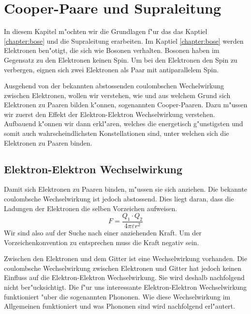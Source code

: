 \chapter{Cooper-Paare und Supraleitung\label{chapter:supraleitung}}
\begin{refsection}


In diesem Kapitel m"ochten wir die Grundlagen f"ur das das Kaptiel \ref{chapter:bose} und
die Supraleitung erarbeiten. Im Kaptiel \ref{chapter:bose} werden Elektronen ben"otigt,
die sich wie Bosonen verhalten. Bosonen haben im Gegensatz zu den Elektronen
keinen Spin. Um bei den Elektronen den Spin zu verbergen, eignen sich zwei Elektronen als Paar mit
antiparallelem Spin.

Ausgehend von der bekannten abstossenden coulombschen Wechelwirkung zwischen Elektronen,
wollen wir verstehen, wie und aus welchem Grund sich Elektronen zu Paaren bilden k"onnen,
sogenannten Cooper-Paaren.
Dazu m"ussen wir zuerst den Effekt der Elektron-Elektron Wechselwirkung verstehen.
Aufbauend k"onnen wir dann erkl"aren, welches die energetisch g"unstigsten und somit auch
wahrscheindlichsten Konstellationen sind, unter welchen sich die Elektronen zu Paaren binden.

\section{Elektron-Elektron Wechselwirkung\label{supraleitung:elektronelektronwecheslwirkung}}
Damit sich Elektronen zu Paaren binden, m"ussen sie sich anziehen.
Die bekannte coulombsche Wechselwirkung ist jedoch abstossend.
Dies liegt daran, dass die Ladungen der Elektronen die selben Vorzeichen aufweisen.
\begin{equation}
F = \frac{Q_1\cdot Q_2}{4\pi \varepsilon r^2}
\label{supraleitung:Coulomb}
\end{equation}
Wir sind also auf der Suche nach einer anziehenden Kraft.
Um der Vorzeichenkonvention zu entsprechen muss die Kraft negativ sein.

Zwischen den Elektronen und dem Gitter ist eine Wechselwirkung vorhanden.
Die coulombsche Wechselwirkung zwischen Elektronen und Gitter hat jedoch keinen Einfluss auf die
Elektron-Elektron Wechselwirkung.
Sie wird deshalb nachfolgend nicht ber"ucksichtigt.
Die f"ur uns interessante Elektron-Elektron Wechselwirkung funktioniert "uber die sogenannten Phononen.
Wie diese Wechselwirkung im Allgemeinen funktioniert und was Phononen sind wird nachfolgend erl"autert.


\end{refsection}
